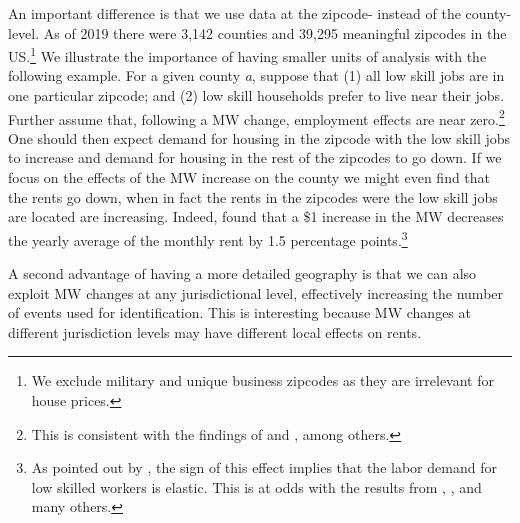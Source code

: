 An important difference is that we use data at the zipcode- instead of the county-level. As of 2019 
there were 3,142 counties and 39,295 meaningful zipcodes in the US.\footnote{We exclude military and 
unique business zipcodes as they are irrelevant for house prices.} We illustrate the importance of 
having smaller units of analysis with the following example. For a given county \textit{a}, suppose 
that (1) all low skill jobs are in one particular zipcode; and (2) low skill households prefer to live 
near their jobs. Further assume that, following a MW change, employment effects are near 
zero.\footnote{This is consistent with the findings of \textcite{card2000minimum} and 
	\textcite{cengiz2019effect}, among others.}
One should then expect demand for housing in the zipcode with the low skill jobs to increase and 
demand for housing in the rest of the zipcodes to go down. If we focus on the effects of the MW 
increase on the county we might even find that the rents go down, when in fact the rents in the 
zipcodes were the low skill jobs are located are increasing. Indeed, \textcite{tidemann2018mw} found 
that a \$1 increase in the MW decreases the yearly average of the monthly rent by 1.5 percentage 
points.\footnote{As pointed out by \textcite{tidemann2018mw}, the sign of this effect implies that 
	the labor demand for low skilled workers is elastic. This is at odds with the results from 
	\textcite{card2000minimum}, \textcite{cengiz2019effect}, and many others.}


A second advantage of having a more detailed geography is that we can also exploit MW changes at any 
jurisdictional level, effectively increasing the number of events used for identification. This is 
interesting because MW changes at different jurisdiction levels may have different local effects on 
rents.

